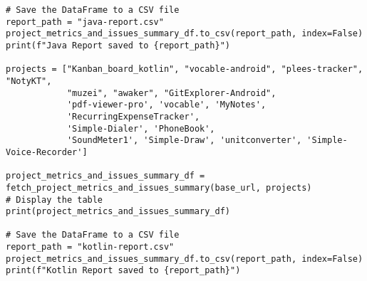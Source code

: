 \begin{lstlisting}
# Save the DataFrame to a CSV file
report_path = "java-report.csv"
project_metrics_and_issues_summary_df.to_csv(report_path, index=False)
print(f"Java Report saved to {report_path}")

projects = ["Kanban_board_kotlin", "vocable-android", "plees-tracker", "NotyKT",
            "muzei", "awaker", "GitExplorer-Android",
            'pdf-viewer-pro', 'vocable', 'MyNotes',
            'RecurringExpenseTracker',
            'Simple-Dialer', 'PhoneBook',
            'SoundMeter1', 'Simple-Draw', 'unitconverter', 'Simple-Voice-Recorder']

project_metrics_and_issues_summary_df = fetch_project_metrics_and_issues_summary(base_url, projects)
# Display the table
print(project_metrics_and_issues_summary_df)

# Save the DataFrame to a CSV file
report_path = "kotlin-report.csv"
project_metrics_and_issues_summary_df.to_csv(report_path, index=False)
print(f"Kotlin Report saved to {report_path}")

\end{lstlisting}

\clearpage
